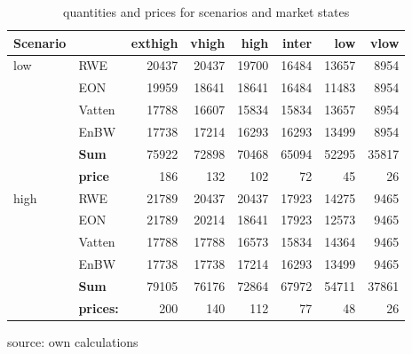 \begin{table}
\centering

\begin{tabular}{llrrrrrr}
\hline
\hline
  Scenario &            &    exthigh &      vhigh &       high &      inter &        low &       vlow \\
\hline
       low &        RWE &      20437 &      20437 &      19700 &      16484 &      13657 &       8954 \\

           &        EON &      19959 &      18641 &      18641 &      16484 &      11483 &       8954 \\

           &     Vatten &      17788 &      16607 &      15834 &      15834 &      13657 &       8954 \\

           &       EnBW &      17738 &      17214 &      16293 &      16293 &      13499 &       8954 \\
\hline
           &  {\bf Sum} &      75922 &      72898 &      70468 &      65094 &      52295 &      35817 \\

           & {\bf price} &        186 &        132 &        102 &         72 &         45 &         26 \\


\hline

      high &        RWE &      21789 &      20437 &      20437 &      17923 &      14275 &       9465 \\

           &        EON &      21789 &      20214 &      18641 &      17923 &      12573 &       9465 \\

           &     Vatten &      17788 &      17788 &      16573 &      15834 &      14364 &       9465 \\

           &       EnBW &      17738 &      17738 &      17214 &      16293 &      13499 &       9465 \\
           \hline
           &  {\bf Sum} &      79105 &      76176 &      72864 &      67972 &      54711 &      37861 \\

           & {\bf prices:} &        200 &        140 &        112 &         77 &         48 &         26 \\
\hline
\hline
\end{tabular}  

\label{tab:dynquant}
\caption{quantities and prices for scenarios and market states}
\begin{center}
source: own calculations
\end{center}
\end{table}

